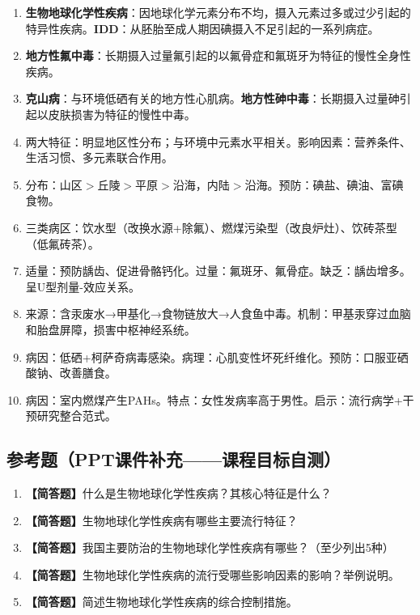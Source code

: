 \documentclass[10pt,a4paper,oneside]{ctexbook}
\begin{document}
\begin{enumerate}[leftmargin=*, itemsep=5pt]
    \item \textbf{生物地球化学性疾病}：因地球化学元素分布不均，摄入元素过多或过少引起的特异性疾病。\textbf{IDD}：从胚胎至成人期因碘摄入不足引起的一系列病症。

    \item \textbf{地方性氟中毒}：长期摄入过量氟引起的以氟骨症和氟斑牙为特征的慢性全身性疾病。

    \item \textbf{克山病}：与环境低硒有关的地方性心肌病。\textbf{地方性砷中毒}：长期摄入过量砷引起以皮肤损害为特征的慢性中毒。

    \item 两大特征：明显地区性分布；与环境中元素水平相关。影响因素：营养条件、生活习惯、多元素联合作用。

    \item 分布：山区$>$丘陵$>$平原$>$沿海，内陆$>$沿海。预防：碘盐、碘油、富碘食物。

    \item 三类病区：饮水型（改换水源+除氟）、燃煤污染型（改良炉灶）、饮砖茶型（低氟砖茶）。

    \item 适量：预防龋齿、促进骨骼钙化。过量：氟斑牙、氟骨症。缺乏：龋齿增多。呈U型剂量-效应关系。

    \item 来源：含汞废水→甲基化→食物链放大→人食鱼中毒。机制：甲基汞穿过血脑和胎盘屏障，损害中枢神经系统。

    \item 病因：低硒+柯萨奇病毒感染。病理：心肌变性坏死纤维化。预防：口服亚硒酸钠、改善膳食。

    \item 病因：室内燃煤产生PAHs。特点：女性发病率高于男性。启示：流行病学+干预研究整合范式。
\end{enumerate}

\subsection*{参考题（PPT课件补充——课程目标自测）}

\begin{enumerate}[leftmargin=*, itemsep=10pt]
    \item \textbf{【简答题】}什么是生物地球化学性疾病？其核心特征是什么？
    \item \textbf{【简答题】}生物地球化学性疾病有哪些主要流行特征？
    \item \textbf{【简答题】}我国主要防治的生物地球化学性疾病有哪些？（至少列出5种）
    \item \textbf{【简答题】}生物地球化学性疾病的流行受哪些影响因素的影响？举例说明。
    \item \textbf{【简答题】}简述生物地球化学性疾病的综合控制措施。
\end{enumerate}
\end{document}
